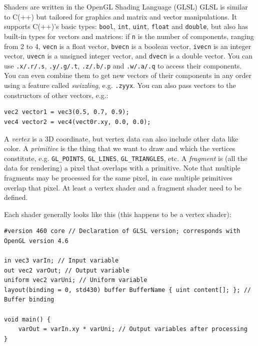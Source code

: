 \documentclass[table, xcdraw]{article}%
\begin{document}
Shaders are written in the OpenGL Shading Language (GLSL) GLSL is similar to C(++) but tailored for graphics and matrix and vector manipulations. It supports C(++)'s basic types: \texttt{bool}, \texttt{int}, \texttt{uint}, \texttt{float} and \texttt{double}, but also has built-in types for vectors and matrices: if \texttt{n} is the number of components, ranging from 2 to 4, \texttt{vecn} is a float vector, \texttt{bvecn} is a boolean vector, \texttt{ivecn} is an integer vector, \texttt{uvecn} is a unsigned integer vector, and \texttt{dvecn} is a double vector. You can use \texttt{.x/.r/.s}, \texttt{.y/.g/.t}, \texttt{.z/.b/.p} and \texttt{.w/.a/.q} to access their components. You can even combine them to get new vectors of their components in any order using a feature called \emph{swizzling}, e.g. \texttt{.zyyx}. You can also pass vectors to the constructors of other vectors, e.g.:

\begin{verbatim}
vec2 vector1 = vec3(0.5, 0.7, 0.9);
vec4 vector2 = vec4(vect0r.xy, 0.0, 0.0);
\end{verbatim}

A \emph{vertex} is a 3D coordinate, but vertex data can also include other data like color. A \emph{primitive} is the thing that we want to draw and which the vertices constitute, e.g. \texttt{GL_POINTS}, \texttt{GL_LINES}, \texttt{GL_TRIANGLES}, etc. A \emph{fragment} is (all the data for rendering) a pixel that overlaps with a primitive. Note that multiple fragments may be processed for the same pixel, in case multiple primitives overlap that pixel. At least a vertex shader and a fragment shader need to be defined.

Each shader generally looks like this (this happens to be a vertex shader):

\begin{verbatim}
#version 460 core // Declaration of GLSL version; corresponds with OpenGL version 4.6

in vec3 varIn; // Input variable
out vec2 varOut; // Output variable
uniform vec2 varUni; // Uniform variable
layout(binding = 0, std430) buffer BufferName { uint content[]; }; // Buffer binding

void main() {
    varOut = varIn.xy * varUni; // Output variables after processing
}
\end{verbatim}
\end{document}

